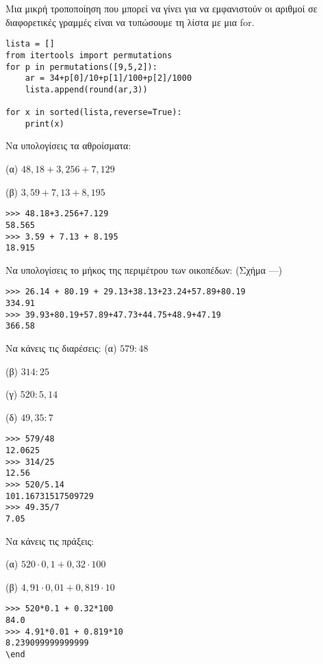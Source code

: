 Μια μικρή τροποποίηση που μπορεί να γίνει για να εμφανιστούν οι αριθμοί σε διαφορετικές γραμμές είναι να τυπώσουμε τη λίστα με μια for.
\begin{lstlisting}
lista = []
from itertools import permutations
for p in permutations([9,5,2]):
    ar = 34+p[0]/10+p[1]/100+p[2]/1000
    lista.append(round(ar,3))

for x in sorted(lista,reverse=True):
    print(x)
\end{lstlisting}

\begin{exercise}
 Να υπολογίσεις τα αθροίσματα:

(α) $48,18 + 3,256 + 7,129$

(β) $3,59 + 7,13 + 8,195$
\end{exercise}

\begin{lstlisting}
>>> 48.18+3.256+7.129
58.565
>>> 3.59 + 7.13 + 8.195
18.915
\end{lstlisting}
\begin{exercise}
Να υπολογίσεις το μήκος της περιμέτρου των οικοπέδων:
(Σχήμα ---)
\end{exercise}
\begin{lstlisting}
>>> 26.14 + 80.19 + 29.13+38.13+23.24+57.89+80.19
334.91
>>> 39.93+80.19+57.89+47.73+44.75+48.9+47.19
366.58
\end{lstlisting}
\begin{exercise}
 Να κάνεις τις διαρέσεις:
(α) $579:48$

(β) $314:25$

(γ) $520:5,14$

(δ) $49,35:7$

\end{exercise}
\begin{lstlisting}
>>> 579/48
12.0625
>>> 314/25
12.56
>>> 520/5.14
101.16731517509729
>>> 49.35/7
7.05
\end{lstlisting}
\begin{exercise}
Να κάνεις τις πράξεις: 

(α) $520 \cdot 0,1 + 0,32 \cdot 100 $

(β) $4,91 \cdot 0,01 + 0,819 \cdot 10$

\end{exercise}

\begin{lstlisting}
>>> 520*0.1 + 0.32*100
84.0
>>> 4.91*0.01 + 0.819*10
8.239099999999999
\end
\end{lstlisting}

